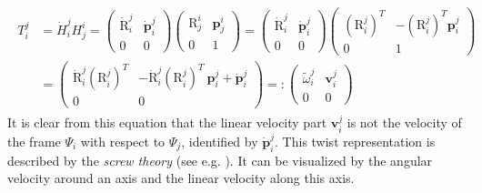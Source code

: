 \documentclass[a4paper,twoside, openright,12pt]{report}
\newcommand{\f}[1]{\boldsymbol{#1}}
\newcommand{\g}[1]{\text{#1}}
\begin{document}
\begin{eqnarray}\label{EQ:twistdecomposition}
\begin{aligned}
T_i^j &= \dot{H}_i^j H_j^i =
\begin{pmatrix}
\dot{\g{R}}_i^j & \dot{\f{p}}_i^j \\ 0 & 0
\end{pmatrix}
\begin{pmatrix}
\g{R}_j^i & \f{p}_j^i \\ 0 & 1
\end{pmatrix} = 
\begin{pmatrix}
\dot{\g{R}}_i^j & \dot{\f{p}}_i^j \\ 0 & 0
\end{pmatrix}
\begin{pmatrix}
(\g{R}_i^j)^T & -(\g{R}_i^j)^T \f{p}_i^j \\ 0 & 1
\end{pmatrix} \\ 
&= 
\begin{pmatrix}
\dot{\g{R}}_i^j(\g{R}_i^j)^T & -\dot{\g{R}}_i^j(\g{R}_i^j)^T\ \f{p}_i^j + \dot{\f{p}}_i^j \\ 0 & 0
\end{pmatrix} =: 
\begin{pmatrix}
\tilde{\omega}_i^j & \f{v}_i^j \\ 0 & 0
\end{pmatrix}
\end{aligned}
\end{eqnarray}
It is clear from this equation that the linear velocity part $\f{v}_i^j$ is not the velocity of the frame $\Psi_i$ with respect to $\Psi_j$, identified by $\dot{\f{p}}_i^j$. This twist representation is described by the \emph{screw theory} (see e.g. \cite{KinematicsHandbook}). It can be visualized by the angular velocity around an axis and the linear velocity along this axis.
\end{document}
